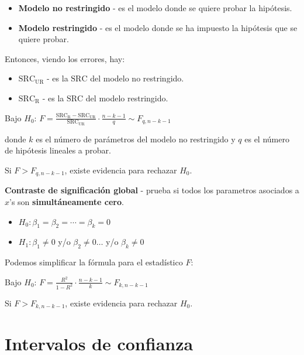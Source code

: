 \documentclass[10pt, a4paper, landscape]{article}
\newcommand{\SSR}{\mathrm{SRC}}
\begin{document}
\begin{multicols}{3}
		\begin{itemize}[leftmargin=*]
			\item \textbf{Modelo no restringido} - es el modelo donde se quiere probar la hipótesis.
			\item \textbf{Modelo restringido} - es el modelo donde se ha impuesto la hipótesis que se quiere probar.
		\end{itemize}
		
		Entonces, viendo los errores, hay:
		
		\begin{itemize}[leftmargin=*]
			\item \textbf{$\SSR_{\mathrm{UR}}$} - es la $\SSR$ del modelo no restringido.
			\item \textbf{$\SSR_{\mathrm{R}}$} - es la $\SSR$ del modelo restringido.
		\end{itemize}
		
		\begin{center}
			Bajo $H_{0}$: \quad $F = \frac{\SSR_{\mathrm{R}}- \SSR_{\mathrm{UR}}}{\SSR_{\mathrm{UR}}} \cdot \frac{n - k - 1}{q} \sim F_{q, n - k - 1}$
		\end{center}
		
		donde $k$ es el número de parámetros del modelo no restringido y $q$ es el número de hipótesis lineales a probar.
		
		Si $F > F_{q, n - k - 1}$, existe evidencia para rechazar $H_{0}$.
		
		\textbf{Contraste de significación global} - prueba si todos los parametros asociados a $x$'s son \textbf{simultáneamente cero}.
		
		\begin{itemize}[leftmargin=*]
			\item $H_{0}: \beta_{1} = \beta_{2} = \cdots = \beta_{k} = 0$
			\item $H_{1}: \beta_{1} \neq 0$ y/o $\beta_{2} \neq 0 \ldots$ y/o $\beta_{k} \neq 0$
		\end{itemize}
		
		Podemos simplificar la fórmula para el estadístico $F$:
		
		\begin{center}
			Bajo $H_{0}$: \quad $F = \frac{R^{2}}{1 - R^{2}} \cdot \frac{n - k - 1}{k} \sim F_{k, n - k - 1}$
		\end{center}
		
		Si $F > F_{k, n - k - 1}$, existe evidencia para rechazar $H_{0}$.
		
		\section*{Intervalos de confianza}
		

\end{multicols}
\end{document}
